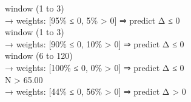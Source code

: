 \begin{flushleft}
\quad \quad window (1 to 3) \\
\quad \quad \quad \quad → weights: [95\% ≤ 0, 5\% > 0] ⇒ predict Δ ≤ 0 \\
\quad \quad window (1 to 3) \\
\quad \quad \quad \quad → weights: [90\% ≤ 0, 10\% > 0] ⇒ predict Δ ≤ 0 \\
\quad \quad window (6 to 120) \\
\quad \quad \quad \quad → weights: [100\% ≤ 0, 0\% > 0] ⇒ predict Δ ≤ 0 \\
\quad N > 65.00 \\
\quad \quad \quad \quad → weights: [44\% ≤ 0, 56\% > 0] ⇒ predict Δ > 0 \\
\end{flushleft}
